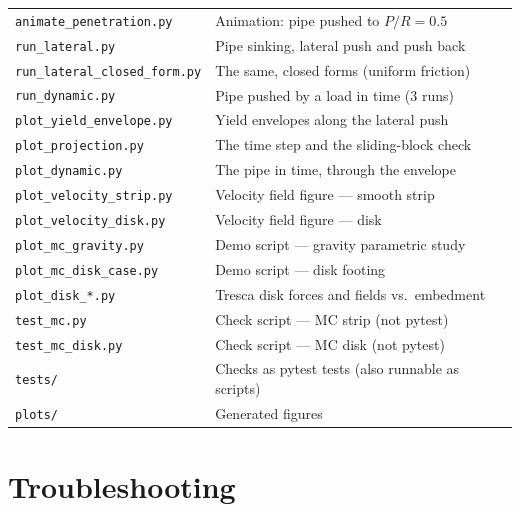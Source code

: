 \documentclass[11pt,a4paper]{article}
\begin{document}
\begin{center}
\begin{tabular}{ll}
\texttt{animate\_penetration.py}        & Animation: pipe pushed to $P/R = 0.5$ \\
\texttt{run\_lateral.py}               & Pipe sinking, lateral push and push back \\
\texttt{run\_lateral\_closed\_form.py}   & The same, closed forms (uniform friction) \\
\texttt{run\_dynamic.py}               & Pipe pushed by a load in time (3 runs) \\
\texttt{plot\_yield\_envelope.py}       & Yield envelopes along the lateral push \\
\texttt{plot\_projection.py}            & The time step and the sliding-block check \\
\texttt{plot\_dynamic.py}               & The pipe in time, through the envelope \\
\texttt{plot\_velocity\_strip.py}       & Velocity field figure — smooth strip \\
\texttt{plot\_velocity\_disk.py}        & Velocity field figure — disk \\
\texttt{plot\_mc\_gravity.py}           & Demo script — gravity parametric study \\
\texttt{plot\_mc\_disk\_case.py}        & Demo script — disk footing \\
\texttt{plot\_disk\_*.py}              & Tresca disk forces and fields vs.\ embedment \\
\texttt{test\_mc.py}                    & Check script — MC strip (not pytest) \\
\texttt{test\_mc\_disk.py}              & Check script — MC disk (not pytest) \\
\texttt{tests/}                        & Checks as pytest tests (also runnable as scripts) \\
\texttt{plots/}                        & Generated figures \\
\bottomrule
\end{tabular}
\end{center}

\section{Troubleshooting}
\label{sec:trouble}
\end{document}
